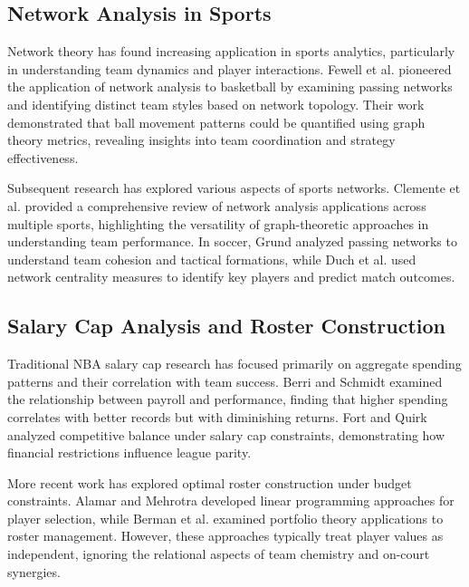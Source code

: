 \documentclass[11pt]{article}
\begin{document}
\subsection{Network Analysis in Sports}

Network theory has found increasing application in sports analytics, particularly in understanding team dynamics and player interactions. Fewell et al. \cite{fewell2012basketball} pioneered the application of network analysis to basketball by examining passing networks and identifying distinct team styles based on network topology. Their work demonstrated that ball movement patterns could be quantified using graph theory metrics, revealing insights into team coordination and strategy effectiveness.

Subsequent research has explored various aspects of sports networks. Clemente et al. \cite{clemente2015general} provided a comprehensive review of network analysis applications across multiple sports, highlighting the versatility of graph-theoretic approaches in understanding team performance. In soccer, Grund \cite{grund2012network} analyzed passing networks to understand team cohesion and tactical formations, while Duch et al. \cite{duch2010quantifying} used network centrality measures to identify key players and predict match outcomes.

\subsection{Salary Cap Analysis and Roster Construction}

Traditional NBA salary cap research has focused primarily on aggregate spending patterns and their correlation with team success. Berri and Schmidt \cite{berri2010wages} examined the relationship between payroll and performance, finding that higher spending correlates with better records but with diminishing returns. Fort and Quirk \cite{fort1995cross} analyzed competitive balance under salary cap constraints, demonstrating how financial restrictions influence league parity.

More recent work has explored optimal roster construction under budget constraints. Alamar and Mehrotra \cite{alamar2011sports} developed linear programming approaches for player selection, while Berman et al. \cite{berman2015optimal} examined portfolio theory applications to roster management. However, these approaches typically treat player values as independent, ignoring the relational aspects of team chemistry and on-court synergies.
\end{document}
